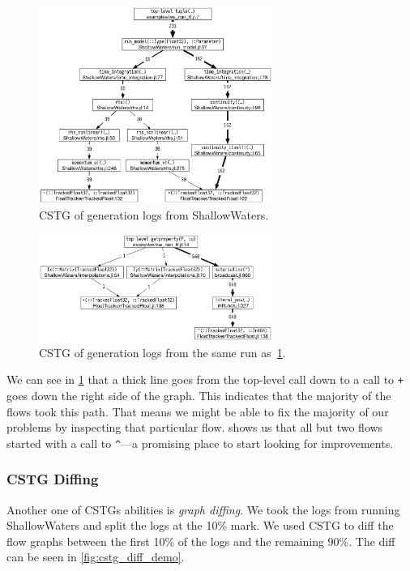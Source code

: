\documentclass{juliacon}
\begin{document}
\begin{figure}[t]
  \centering
  \includegraphics[width=3in]{fig/sw_nan_cstg_clean.png}
  \caption{CSTG of \NaN{} generation logs from ShallowWaters.}
  \label{fig:sw_nan_cstg}
\end{figure}

\begin{figure}[t]
  \centering
  \includegraphics[width=3in]{fig/sw_inf_cstg_clean.png}
  \caption{CSTG of \Inf{} generation logs from the same run as~\cref{fig:sw_nan_cstg}.}
  \label{fig:sw_inf_cstg}
\end{figure}

We can see in \cref{fig:sw_nan_cstg} that a thick line goes from the top-level call down to a call to \texttt{+} goes down the right side of the graph.
This indicates that the majority of the flows took this path.
That means we might be able to fix the majority of our problems by inspecting that particular flow.
 shows us that all but two flows started with a call to \texttt{\^}---a promising place to start looking for improvements.

\subsubsection{CSTG Diffing}

Another one of CSTGs abilities is \emph{graph diffing}.
We took the \FT{} logs from running ShallowWaters and split the logs at the 10\% mark.
We used CSTG to diff the flow graphs between the first 10\% of the logs and the remaining 90\%.
The diff can be seen in \cref{fig:cstg_diff_demo}.
\end{document}
